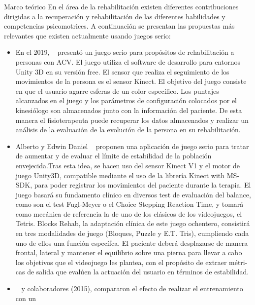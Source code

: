 \begin{thesischapter}{1} {Marco teórico}
    En el área de la rehabilitación %
    existen diferentes contribuciones dirigidas a la recuperación 
    y rehabilitación de las diferentes habilidades y competencias psicomotrices. A continuación se presentan las propuestas más relevantes 
    que existen actualmente usando juegos serio:
    \begin{itemize}
        \item En el 2019, ~\cite{rodriguez2019design} presentó un juego serio para propósitos de rehabilitación a personas con ACV. El juego 
        utiliza el software de desarrollo para entornos Unity 3D en su versión free. El sensor que realiza el seguimiento de los movimientos 
        de la persona es el sensor Kinect. El objetivo del juego consiste en que el usuario agarre esferas de un color específico. Los puntajes 
        alcanzados en el juego y los parámetros de configuración colocados por el kinesiólogo son almacenados junto con la información del paciente. 
        De esta manera el fisioterapeuta puede recuperar los datos almacenados y realizar un análisis de la evaluación de la evolución de la persona 
        en su rehabilitación.
        \item Alberto y Edwin Daniel ~\cite{morales2019desarrollo} proponen una aplicación de juego serio para tratar de aumentar y de evaluar 
        el límite de estabilidad de la población envejecida.Tras esta idea, se hacen uso del sensor Kinect V1 y el 
        motor de juego Unity3D, compatible mediante el uso de la librería Kinect with MS-SDK, para poder registrar los movimientos del paciente durante 
        la terapia. El juego basará su fundamento clínico en diversos test de evaluación del balance, como son el test Fugl-Meyer o el Choice Stepping 
        Reaction Time, y tomará como mecánica de referencia la de uno de los clásicos de los videojuegos, el Tetris. Blocks Rehab, la adaptación clínica 
        de este juego ochentero, consistirá en tres modalidades de juego (Bloques, Puzzle y E.T. Tris), cumpliendo cada uno de ellos una función específca. 
        El paciente deberá desplazarse de manera frontal, lateral y mantener el equilibrio sobre una pierna para llevar a cabo los objetivos que el 
        videojuego les plantea, con el propósito de extraer métri- cas de salida que evalúen la actuación del usuario en términos de estabilidad. 
        \item ~\cite{doi:10.1177/1545968314535985} y colaboradores (2015), compararon el efecto de realizar el entrenamiento con un

\end{itemize}
\end{thesischapter}
